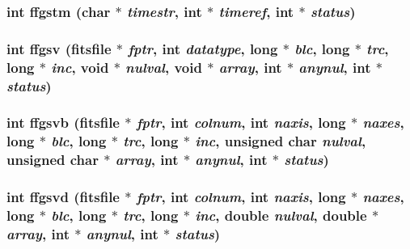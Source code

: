 \subsubsection{\setlength{\rightskip}{0pt plus 5cm}int ffgstm (char $\ast$ {\em timestr}, int $\ast$ {\em timeref}, int $\ast$ {\em status})}\label{test_2roimasker_2fitsio_8h_261640d215b78ccc9368b45915b4b199}


\subsubsection{\setlength{\rightskip}{0pt plus 5cm}int ffgsv (\bf{fitsfile} $\ast$ {\em fptr}, int {\em datatype}, long $\ast$ {\em blc}, long $\ast$ {\em trc}, long $\ast$ {\em inc}, void $\ast$ {\em nulval}, void $\ast$ {\em array}, int $\ast$ {\em anynul}, int $\ast$ {\em status})}\label{test_2roimasker_2fitsio_8h_caeaf7b359e9abbf70e7e912e14329fa}


\subsubsection{\setlength{\rightskip}{0pt plus 5cm}int ffgsvb (\bf{fitsfile} $\ast$ {\em fptr}, int {\em colnum}, int {\em naxis}, long $\ast$ {\em naxes}, long $\ast$ {\em blc}, long $\ast$ {\em trc}, long $\ast$ {\em inc}, unsigned char {\em nulval}, unsigned char $\ast$ {\em array}, int $\ast$ {\em anynul}, int $\ast$ {\em status})}\label{test_2roimasker_2fitsio_8h_83da0d68b492ed457e64f01e1dfad807}


\subsubsection{\setlength{\rightskip}{0pt plus 5cm}int ffgsvd (\bf{fitsfile} $\ast$ {\em fptr}, int {\em colnum}, int {\em naxis}, long $\ast$ {\em naxes}, long $\ast$ {\em blc}, long $\ast$ {\em trc}, long $\ast$ {\em inc}, double {\em nulval}, double $\ast$ {\em array}, int $\ast$ {\em anynul}, int $\ast$ {\em status})}\label{test_2roimasker_2fitsio_8h_d7a1005a5c7e8f1f436eac3d8e5d837d}



